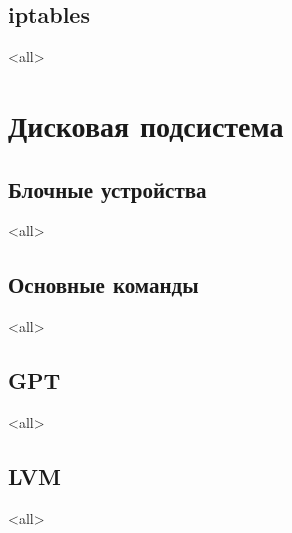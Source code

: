 \section{iptables}
\mode<all>{}

\chapter{Дисковая подсистема}

\section{Блочные устройства}
\mode<all>{}
\section{Основные команды}
\mode<all>{}
\section{GPT}
\mode<all>{}
\section{LVM}
\mode<all>{}



